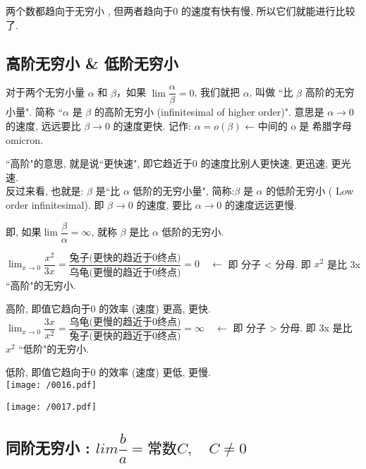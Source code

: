 \documentclass[UTF8]{ctexart}
\begin{document}
两个数都趋向于无穷小 , 但两者趋向于0 的速度有快有慢, 所以它们就能进行比较了.




\subsection{ 高阶无穷小 \& 低阶无穷小} 

对于两个无穷小量 $\alpha$ 和 $\beta$，如果 $\lim \dfrac{\alpha} {\beta}=0$, 我们就把  $\alpha$, 叫做 ``比 $\beta$ 高阶的无穷小量". 简称 ``$\alpha$ 是 $\beta$ 的高阶无穷小  (infinitesimal of higher order)".  意思是 $\alpha \to 0$ 的速度, 远远要比 $\beta \to 0$ 的速度更快.  记作: $\alpha = o(\beta)$  ← 中间的 o 是 希腊字母 omicron.

``高阶"的意思, 就是说``更快速", 即它趋近于0 的速度比别人更快速, 更迅速, 更光速. \\

反过来看, 也就是:  $\beta$ 是``比 $\alpha$ 低阶的无穷小量", 简称:$\beta$ 是  $\alpha$ 的低阶无穷小 ( Low order infinitesimal). 即  $\beta \to 0$  的速度, 要比 $\alpha \to 0$  的速度远远更慢.

即, 如果$\lim \dfrac{\beta} {\alpha} = \infty$, 就称 $\beta$ 是比 $\alpha$ 低阶的无穷小.


\begin{myEnvSample}
$ \lim_{x \to 0} \dfrac{x^2} {3x} = \dfrac{\text{兔子(更快的趋近于0终点)}} {\text{乌龟(更慢的趋近于0终点)}} = 0 \quad \gets $   即 分子 < 分母.  即 $x^2$ 是比 3x ``高阶"的无穷小.

高阶, 即值它趋向于0 的效率 (速度) 更高, 更快. \\


$ \lim_{x \to 0} \dfrac{3x} {x^2} = \dfrac{\text{乌龟(更慢的趋近于0终点)}} {\text{兔子(更快的趋近于0终点)}} = \infty \quad \gets $  即 分子 > 分母.  即 3x 是比 $x^2$ ``低阶"的无穷小. 

低阶, 即值它趋向于0 的效率 (速度) 更低, 更慢. \\

\texttt{[image: /0016.pdf]}

\texttt{[image: /0017.pdf]}
\end{myEnvSample}




\subsection{同阶无穷小 : $lim \dfrac{b} {a}= \text{常数}C, \quad C \ne 0$} 
\end{document}

